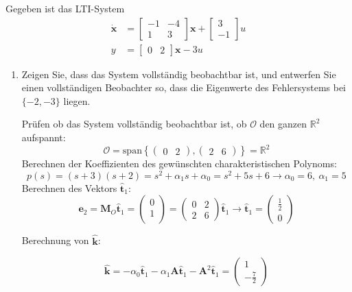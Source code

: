 \documentclass[crop=false]{standalone}
\begin{document}
\begin{task}
Gegeben ist das LTI-System
\[
\begin{aligned} \dot{\mathbf{x}} &=\left[\begin{array}{cc}{-1} & {-4} \\ {1} & {3}\end{array}\right] \mathbf{x}+\left[\begin{array}{c}{3} \\ {-1}\end{array}\right] u \\ y &=\left[\begin{array}{cc}{0} & {2}\end{array}\right] \mathbf{x}-3 u \end{aligned}
\]
 \begin{enumerate}[i]
     \item Zeigen Sie, dass das System vollständig beobachtbar ist, und entwerfen Sie einen
vollständigen Beobachter so, dass die Eigenwerte des Fehlersystems bei $\{-2,-3\}$
liegen.
     \begin{solution}
     Prüfen ob das System vollständig beobachtbar ist, ob $\mathcal{O}$ den ganzen $\mathbb{R}^2$ aufspannt:
     \[\mathcal{O} = \text{span}\left\{
     \begin{pmatrix}0 & 2\end{pmatrix},\begin{pmatrix}2 & 6\end{pmatrix}\right\} = \mathbb{R}^2 \]
     Berechnen der Koeffizienten des gewünschten charakteristischen Polynoms:
     \[p(s) = \left( s+3 \right) \left( s+2 \right) = s^2 + \alpha_1 s + \alpha_0 =s^2 + 5s + 6 \rightarrow \alpha_0 = 6, \ \alpha_1 = 5  \]
     Berechnen des Vektors $\hat{\mathbf{t}}_1$:
     \[
     \mathbf{e}_2 = \mathbf{M}_O \hat{\mathbf{t}}_1 =
     \begin{pmatrix}0 \\ 1\\\end{pmatrix} = 
     \begin{pmatrix}0 & 2\\ 2 & 6\end{pmatrix}\hat{\mathbf{t}}_1
     \rightarrow \hat{\mathbf{t}}_1 = \begin{pmatrix}\frac{1}{2} \\ 0\end{pmatrix}
     \]
     
     Berechnung von $\hat{\mathbf{k}}$:
     
     \[\hat{\mathbf{k}} = - \alpha_0 \hat{\mathbf{t}}_1 - \alpha_1 \mathbf{A} \hat{\mathbf{t}}_1 - \mathbf{A}^2 \hat{\mathbf{t}}_1 = \begin{pmatrix} 1 \\ -\frac{7}{2}\end{pmatrix}\]
     

\end{solution}
\end{enumerate}
\end{task}
\end{document}
